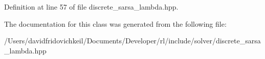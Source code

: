 Definition at line 57 of file discrete\+\_\+sarsa\+\_\+lambda.\+hpp.



The documentation for this class was generated from the following file\+:\begin{DoxyCompactItemize}
\item 
/\+Users/davidfridovichkeil/\+Documents/\+Developer/rl/include/solver/discrete\+\_\+sarsa\+\_\+lambda.\+hpp\end{DoxyCompactItemize}
